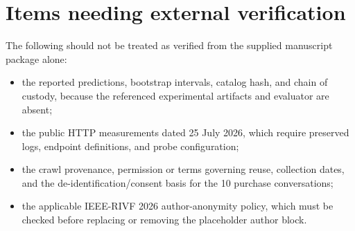\documentclass[11pt]{article}
\begin{document}
\section*{Items needing external verification}

The following should not be treated as verified from the supplied manuscript package alone:
\begin{itemize}
  \item the reported predictions, bootstrap intervals, catalog hash, and chain of custody, because the referenced experimental artifacts and evaluator are absent;
  \item the public HTTP measurements dated 25 July 2026, which require preserved logs, endpoint definitions, and probe configuration;
  \item the crawl provenance, permission or terms governing reuse, collection dates, and the de-identification/consent basis for the 10 purchase conversations;
  \item the applicable IEEE-RIVF 2026 author-anonymity policy, which must be checked before replacing or removing the placeholder author block.
\end{itemize}
\end{document}
